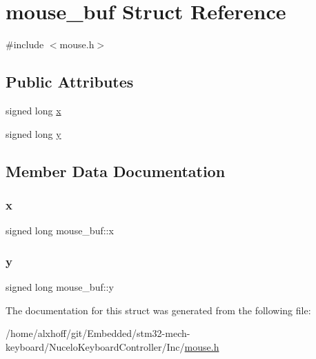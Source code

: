 \hypertarget{structmouse__buf}{}\section{mouse\+\_\+buf Struct Reference}
\label{structmouse__buf}


{\ttfamily \#include $<$mouse.\+h$>$}

\subsection*{Public Attributes}
\begin{DoxyCompactItemize}
\item 
signed long \hyperlink{structmouse__buf_aceaf058aa49dbb28e8131c018eb3c643}{x}
\item 
signed long \hyperlink{structmouse__buf_a7d1dd1aa9db68cc54f7d9386537b0dbc}{y}
\end{DoxyCompactItemize}


\subsection{Member Data Documentation}
\mbox{\label{structmouse__buf_aceaf058aa49dbb28e8131c018eb3c643}} 
\subsubsection{\texorpdfstring{x}{x}}
{\footnotesize\ttfamily signed long mouse\+\_\+buf\+::x}

\mbox{\label{structmouse__buf_a7d1dd1aa9db68cc54f7d9386537b0dbc}} 
\subsubsection{\texorpdfstring{y}{y}}
{\footnotesize\ttfamily signed long mouse\+\_\+buf\+::y}



The documentation for this struct was generated from the following file\+:\begin{DoxyCompactItemize}
\item 
/home/alxhoff/git/\+Embedded/stm32-\/mech-\/keyboard/\+Nucelo\+Keyboard\+Controller/\+Inc/\hyperlink{mouse_8h}{mouse.\+h}\end{DoxyCompactItemize}

